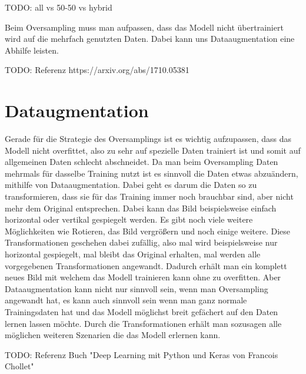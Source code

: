 \documentclass[11pt, a4paper]{article}
\begin{document}
TODO: all vs 50-50 vs hybrid

Beim Oversampling muss man aufpassen, dass das Modell nicht übertrainiert wird auf die mehrfach genutzten Daten. Dabei kann uns Dataaugmentation eine Abhilfe leisten.

TODO: Referenz https://arxiv.org/abs/1710.05381


\section{Dataugmentation}
Gerade für die Strategie des Oversamplings ist es wichtig aufzupassen, dass das Modell nicht overfittet, also zu sehr auf spezielle Daten trainiert ist und somit auf allgemeinen Daten schlecht abschneidet. Da man beim Oversampling Daten mehrmals für dasselbe Training nutzt ist es sinnvoll die Daten etwas abzuändern, mithilfe von Dataaugmentation. Dabei geht es darum die Daten so zu transformieren, dass sie für das Training immer noch brauchbar sind, aber nicht mehr dem Original entsprechen. Dabei kann das Bild beispielsweise einfach horizontal oder vertikal gespiegelt werden. Es gibt noch viele weitere Möglichkeiten wie Rotieren, das Bild vergrößern und noch einige weitere. Diese Transformationen geschehen dabei zufällig, also mal wird beispielsweise nur horizontal gespiegelt, mal bleibt das Original erhalten, mal werden alle vorgegebenen Transformationen angewandt. Dadurch erhält man ein komplett neues Bild mit welchem das Modell trainieren kann ohne zu overfitten. Aber Dataaugmentation kann nicht nur sinnvoll sein, wenn man Oversampling angewandt hat, es kann auch sinnvoll sein wenn man ganz normale Trainingsdaten hat und das Modell möglichst breit gefächert auf den Daten lernen lassen möchte. Durch die Transformationen erhält man sozusagen alle möglichen weiteren Szenarien die das Modell erlernen kann.

TODO: Referenz Buch "Deep Learning mit Python und Keras von Francois Chollet"
\end{document}
